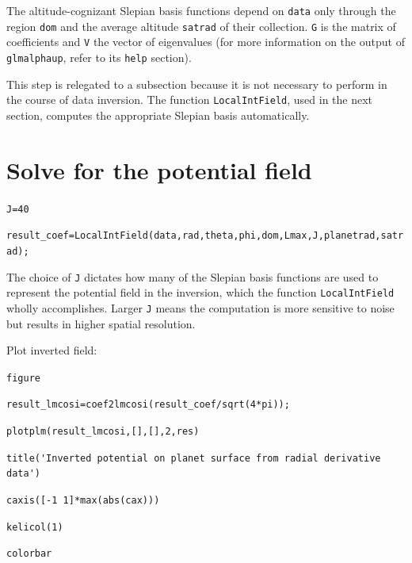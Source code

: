 \documentclass{article}
\begin{document}
\setlength{\parskip}{0.5cm plus4mm minus3mm}

The altitude-cognizant Slepian basis functions depend on \verb!data! only through the region \verb!dom! and the average altitude \verb!satrad! of their collection. \verb!G! is the matrix of coefficients and \verb!V! the vector of eigenvalues (for more information on the output of \verb!glmalphaup!, refer to its \verb!help! section).

This step is relegated to a subsection because it is not necessary to perform in the course of data inversion. The function \verb!LocalIntField!, used in the next section, computes the appropriate Slepian basis automatically.

\section{Solve for the potential field}

\vspace{3mm}

\setlength{\parskip}{.1mm}

\verb!J=40!

\verb!result_coef=LocalIntField(data,rad,theta,phi,dom,Lmax,J,planetrad,satrad);!


\setlength{\parskip}{0.5cm plus4mm minus3mm}


The choice of \verb!J! dictates how many of the Slepian basis functions are used to represent the potential field in the inversion, which the function \verb!LocalIntField! wholly accomplishes. Larger \verb!J! means the computation is more sensitive to noise but results in higher spatial resolution.

Plot inverted field:

\vspace{3mm}

\setlength{\parskip}{.1mm}

\verb!figure!

\verb!result_lmcosi=coef2lmcosi(result_coef/sqrt(4*pi));!

\verb!plotplm(result_lmcosi,[],[],2,res)!

\verb!title('Inverted potential on planet surface from radial derivative data')!

\verb!caxis([-1 1]*max(abs(cax)))!

\verb!kelicol(1)!

\verb!colorbar !
\end{document}
